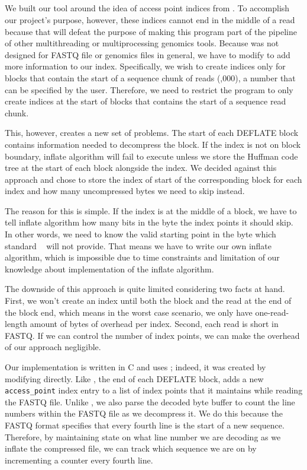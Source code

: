 \subsection{\ibuilder}
\label{sec:ibuilder}
We built our \ibuilder tool around the idea of access point indices from \zran.
To accomplish our project's purpose, however,
these indices cannot end in the middle of a read because
that will defeat the purpose of making this program part of the pipeline of
other multithreading or multiprocessing genomics tools. Because \zran was
not designed for FASTQ file or genomics files in general, we have to modify
\zran to add more information to our index. Specifically, we wish to create
indices only for \gzip blocks that contain the start of a sequence chunk of
reads (,000), a number that can be specified by the user. Therefore, we
need to restrict the program to only create indices at the start of blocks
that contains the start of a sequence read chunk.

This, however, creates a new set of problems. The start of each DEFLATE block
contains information needed to decompress the block. If the index is not on
block boundary, inflate algorithm will fail to execute unless we store the
Huffman code tree at the start of each block alongside the index. We decided
against this approach and chose to store the index of start of the corresponding
block for each index and how many uncompressed bytes we need to skip instead. 

The reason for this is simple. If the index is at the middle of a block, we have to tell inflate algorithm how many bits in the byte the index points it should skip. In other words, we need to know the valid starting point in the byte which standard \zlib~\cite{zlib} will not provide. That means we have to write our own inflate algorithm, which is impossible due to time constraints and limitation of our knowledge about implementation of the inflate algorithm. 

The downside of this approach is quite limited considering two facts at hand.
First, we won't create an index until both the block and the read at the end of
the block end, which means in the worst case scenario, we only have
one-read-length amount of bytes of overhead per index. Second, each read is
short in FASTQ. If we can control the number of index points, we can make the
overhead of our approach negligible.  

Our \ibuilder implementation is written in C and uses \zlib; indeed, it was
created by modifying \zran directly. Like \zran, the end of each DEFLATE block,
\ibuilder adds a new \texttt{access\_point} index entry to a list of index
points that it maintains while reading the \gzip FASTQ file. Unlike \zran, we
also parse the decoded byte buffer to count the line numbers within the FASTQ
file as we decompress it. We do this because the FASTQ format specifies that
every fourth line is the start of a new sequence. Therefore, by maintaining
state on what line number we are decoding as we inflate the compressed file, we can
track which sequence we are on by incrementing a counter every fourth line. 

